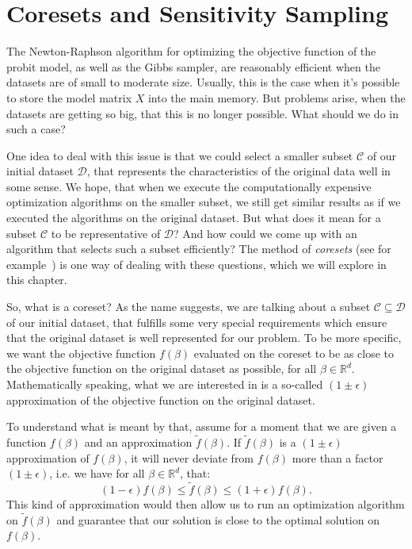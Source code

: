 \section{Coresets and Sensitivity Sampling}

The Newton-Raphson algorithm for optimizing the
objective function of the probit model,
as well as the Gibbs sampler, are reasonably efficient
when the datasets are of small to moderate size.
Usually, this is the case when it's possible to
store the model matrix $X$ into the main memory.
But problems arise, when the datasets are getting
so big, that this is no longer possible.
What should we do in such a case?

One idea to deal with this issue is that we could
select a smaller subset $\mathcal{C}$ of our initial dataset
$\mathcal{D}$, that represents the characteristics of
the original data well in some sense.
We hope, that when we execute the computationally expensive
optimization algorithms on the smaller subset,
we still get similar results as if we executed the
algorithms on the original dataset.
But what does it mean for a subset $\mathcal{C}$
to be representative of $\mathcal{D}$?
And how could we come up with an algorithm
that selects such a subset efficiently?
The method of \textit{coresets}
(see for example~\cite{munteanu-coresets-introduction}) is one way
of dealing with these questions, which we will explore in this chapter.

So, what is a coreset? As the name suggests, we are
talking about a subset $\mathcal{C} \subseteq \mathcal{D}$
of our initial dataset, that fulfills some very special
requirements which ensure that the original
dataset is well represented for our problem.
To be more specific, we want the objective function
$f(\beta)$ evaluated on the coreset to be
as close to the objective function on the original dataset as possible,
for all $\beta \in \mathbb{R}^d$.
Mathematically speaking, what we are interested in is
a so-called $(1 \pm \epsilon)$ approximation of the
objective function on the original dataset.

To understand what is meant by that, assume for a moment
that we are given a function $f(\beta)$ and an
approximation $\tilde f(\beta)$.
If $\tilde f(\beta)$ is a $(1 \pm \epsilon)$ approximation
of $f(\beta)$, it will never deviate from $f(\beta)$
more than a factor $(1 \pm \epsilon)$, i.e.
we have for all $\beta \in \mathbb{R}^d$, that:
\begin{equation*}
    (1 - \epsilon) f(\beta) \leq \tilde f(\beta) \leq (1 + \epsilon) f(\beta).
\end{equation*}
This kind of approximation would then allow us to run
an optimization algorithm on $\tilde f(\beta)$ and
guarantee that our solution is close to the
optimal solution on $f(\beta)$.

